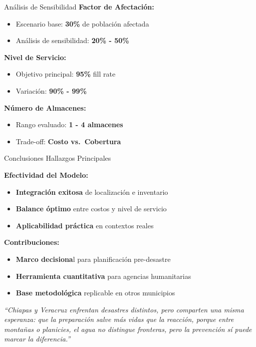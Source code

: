 \documentclass[
  ignorenonframetext,
]{beamer}
\providecommand{\tightlist}{%
  \setlength{\itemsep}{0pt}\setlength{\parskip}{0pt}}
\begin{document}
\begin{frame}{Análisis de Sensibilidad}
\label{anuxe1lisis-de-sensibilidad}
\textbf{Factor de Afectación:}

\begin{itemize}
\tightlist
\item
  Escenario base: \textbf{30\%} de población afectada
\item
  Análisis de sensibilidad: \textbf{20\% - 50\%}
\end{itemize}

\textbf{Nivel de Servicio:}

\begin{itemize}
\tightlist
\item
  Objetivo principal: \textbf{95\%} fill rate
\item
  Variación: \textbf{90\% - 99\%}
\end{itemize}

\textbf{Número de Almacenes:}

\begin{itemize}
\tightlist
\item
  Rango evaluado: \textbf{1 - 4 almacenes}
\item
  Trade-off: \textbf{Costo vs.~Cobertura}
\end{itemize}
\end{frame}

\begin{frame}{Conclusiones}
\label{conclusiones}
Hallazgos Principales

\textbf{Efectividad del Modelo:}

\begin{itemize}
\tightlist
\item
  \textbf{Integración exitosa} de localización e inventario
\item
  \textbf{Balance óptimo} entre costos y nivel de servicio
\item
  \textbf{Aplicabilidad práctica} en contextos reales
\end{itemize}

\textbf{Contribuciones:}

\begin{itemize}
\tightlist
\item
  \textbf{Marco decisiona}l para planificación pre-desastre
\item
  \textbf{Herramienta cuantitativa} para agencias humanitarias
\item
  \textbf{Base metodológica} replicable en otros municipios
\end{itemize}

\vspace{1em}

\begin{block}{}
\centering
\large
\textit{
“Chiapas y Veracruz enfrentan desastres distintos, pero comparten una misma esperanza:  
que la preparación salve más vidas que la reacción,  
porque entre montañas o planicies, el agua no distingue fronteras,  
pero la prevención sí puede marcar la diferencia.”
}
\end{block}
\end{frame}
\end{document}
